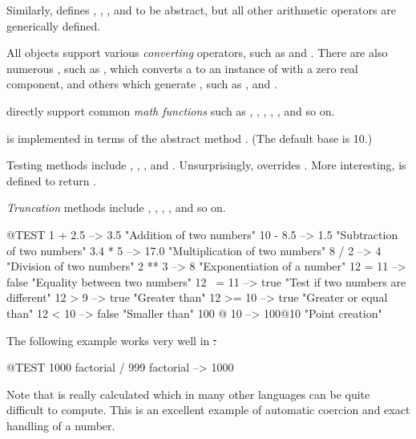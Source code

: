\documentclass[a4paper,10pt,twoside]{book}
\begin{document}
Similarly,  defines , , , and  to be abstract, but all other arithmetic operators are generically defined.

All  objects support various \emph{converting} operators, such as  and .
There are also numerous , such as , which converts a  to an instance of  with a zero real component, and others which generate , such as ,  and .

 directly support common \emph{math functions} such as , , , , , and so on.

 is implemented in terms of the abstract method .
(The default base is 10.)

Testing methods include , , , and .
Unsurprisingly,  overrides .
More interesting,  is defined to return .

\emph{Truncation} methods include , , , , and so on.

\begin{code}{@TEST}
1 + 2.5     --> 3.5             "Addition of two numbers"
10 - 8.5   --> 1.5              "Subtraction of two numbers"
3.4 * 5      --> 17.0           "Multiplication of two numbers"
8 / 2         --> 4                 "Division of two numbers"
2 ** 3         --> 8                 "Exponentiation of a number"
12 = 11    --> false           "Equality between two numbers"
12 ~= 11 --> true            "Test if two numbers are different"
12 > 9      --> true            "Greater than"
12 >= 10  --> true            "Greater or equal  than"
12 < 10    --> false           "Smaller than"
100 @ 10   --> 100@10    "Point creation"
\end{code}

The following example works very well in \st:
\begin{code}{@TEST}
1000 factorial / 999 factorial --> 1000
\end{code}
Note that  is really calculated which in many other languages can be quite difficult to compute.
This is an excellent example of automatic coercion and exact handling of a number.
\end{document}
